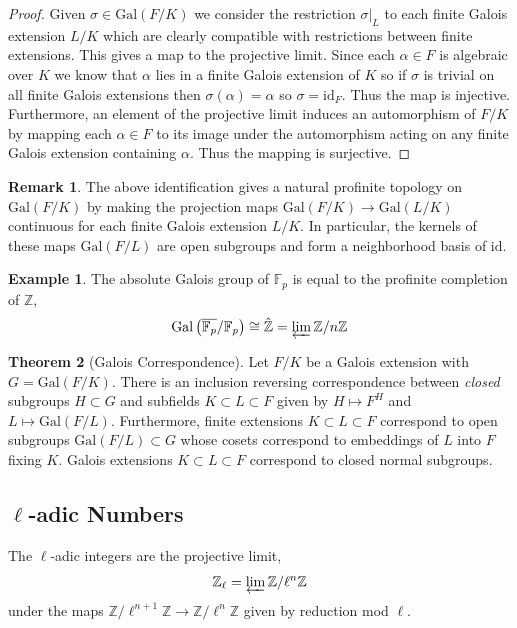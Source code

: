 \documentclass{article}
\newcommand{\Gal}[1]{\mathrm{Gal}\left( #1 \right)}
\newcommand{\Z}{\mathbb{Z}}
\newcommand{\id}{\mathrm{id}}
\theoremstyle{definition}
\newtheorem{theorem}{Theorem}[section]
\newtheorem{example}[theorem]{Example}
\newtheorem{remark}{Remark}[section]
\newenvironment{definition}[1][Definition:]{\begin{trivlist}
\item[\hskip \labelsep {\bfseries #1}]}{\end{trivlist}}
\newcommand{\finfield}[1]{\mathbb{F}_{#1}}
\begin{document}
\begin{proof}
Given $\sigma \in \Gal{F / K}$ we consider the restriction $\sigma |_L$ to each finite Galois extension $L / K$ which are clearly compatible with restrictions between finite extensions. This gives a map to the projective limit. Since each $\alpha \in F$ is algebraic over $K$ we know that $\alpha$ lies in a finite Galois extension of $K$ so if $\sigma$ is trivial on all finite Galois extensions then $\sigma(\alpha) = \alpha$ so $\sigma = \id_F$. Thus the map is injective. Furthermore, an element of the projective limit induces an automorphism of $F / K$ by mapping each $\alpha \in F$ to its image under the automorphism acting on any finite Galois extension containing $\alpha$. Thus the mapping is surjective. 
\end{proof}

\begin{remark}
The above identification gives a natural profinite topology on $\Gal{F/ K}$ by making the projection maps $\Gal{F / K} \to \Gal{L / K}$ continuous for each finite Galois extension $L / K$. In particular, the kernels of these maps $\Gal{F / L}$ are open subgroups and form a neighborhood basis of $\id$. 
\end{remark}

\begin{example}
The absolute Galois group of $\finfield{p}$ is equal to the profinite completion of $\Z$, 
\[ \Gal{\overline{\finfield{p}} / \finfield{p}} \cong \hat{\Z} = \varprojlim \Z / n \Z \]
\end{example}

\begin{theorem}[Galois Correspondence]
Let $F / K$ be a Galois extension with $G = \Gal{F / K}$. There is an inclusion reversing correspondence between \textit{closed} subgroups $H \subset G$ and subfields $K \subset L \subset F$ given by $H \mapsto F^H$ and $L \mapsto \Gal{F / L}$.
Furthermore, finite extensions $K \subset L \subset F$ correspond to open subgroups $\Gal{F / L} \subset G$ whose cosets correspond to embeddings of $L$ into $F$ fixing $K$. Galois extensions $K \subset L \subset F$ correspond to closed normal subgroups. 
\end{theorem}


\subsection{$\ell$-adic Numbers}

\begin{definition}
The $\ell$-adic integers are the projective limit,
\[ \Z_{\ell} = \varprojlim \Z / \ell^n \Z \]
under the maps $\Z / \ell^{n+1} \Z \to \Z / \ell^n \Z$ given by reduction mod $\ell$. 
\end{definition}
\end{document}
